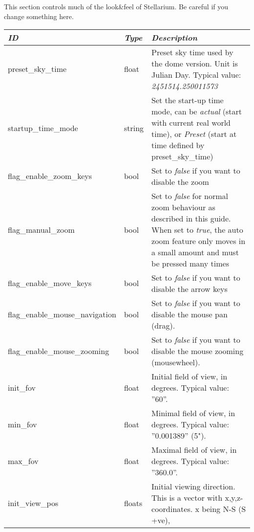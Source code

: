 \subsection{}

This section controls much of the look\&feel of Stellarium. Be careful if you change something here.


\begin{longtable}{l|l|p{77mm}}\toprule
\emph{ID}              & \emph{Type} & \emph{Description}\\\midrule
preset\_sky\_time               & float  & Preset sky time used by the dome version. Unit is Julian Day. Typical value: \emph{2451514.250011573}\\%
startup\_time\_mode             & string & Set the start-up time mode, can be \emph{actual} (start with current real world time), 
                                           or \emph{Preset} (start at time defined by preset\_sky\_time)\\%
flag\_enable\_zoom\_keys        & bool   & Set to \emph{false} if you want to disable the zoom\\%
flag\_manual\_zoom              & bool   & Set to \emph{false} for normal zoom behaviour as described in this guide. 
                                           When set to \emph{true}, the auto zoom feature only moves in a small amount and must be pressed many times\\%
flag\_enable\_move\_keys        & bool   & Set to \emph{false} if you want to disable the arrow keys\\%
flag\_enable\_mouse\_navigation & bool   & Set to \emph{false} if you want to disable the mouse pan (drag).\\%
flag\_enable\_mouse\_zooming & bool   & Set to \emph{false} if you want to disable the mouse zooming (mousewheel).\\%
init\_fov                       & float  & Initial field of view, in degrees. Typical value: ''60''.\\%
min\_fov                        & float  & Minimal field of view, in degrees. Typical value: ''0.001389'' (5").\\%
max\_fov                        & float  & Maximal field of view, in degrees. Typical value: ''360.0''.\\%
init\_view\_pos                 & floats & Initial viewing direction. This is a vector with x,y,z-coordinates. x being N-S (S +ve), 

\end{longtable}
